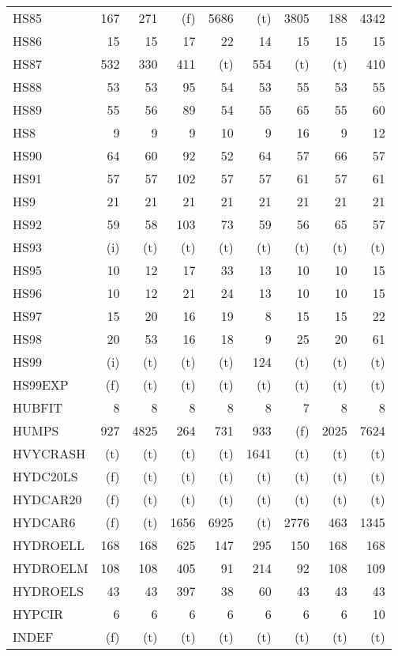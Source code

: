 \documentclass[11pt,twoside]{article}
\begin{document}
{\begin{longtable}[c]{|l|r|r|r|r|r|r|r|r|}
 HS85 & 167 & 271 & (f) & 5686 & (t) & 3805 & 188 & 4342 \\
 HS86 & 15 & 15 & 17 & 22 & 14 & 15 & 15 & 15 \\
 HS87 & 532 & 330 & 411 & (t) & 554 & (t) & (t) & 410 \\
 HS88 & 53 & 53 & 95 & 54 & 53 & 55 & 53 & 55 \\
 HS89 & 55 & 56 & 89 & 54 & 55 & 65 & 55 & 60 \\
 HS8 & 9 & 9 & 9 & 10 & 9 & 16 & 9 & 12 \\
 HS90 & 64 & 60 & 92 & 52 & 64 & 57 & 66 & 57 \\
 HS91 & 57 & 57 & 102 & 57 & 57 & 61 & 57 & 61 \\
 HS9 & 21 & 21 & 21 & 21 & 21 & 21 & 21 & 21 \\
 HS92 & 59 & 58 & 103 & 73 & 59 & 56 & 65 & 57 \\
 HS93 & (i) & (t) & (t) & (t) & (t) & (t) & (t) & (t) \\
 HS95 & 10 & 12 & 17 & 33 & 13 & 10 & 10 & 15 \\
 HS96 & 10 & 12 & 21 & 24 & 13 & 10 & 10 & 15 \\
 HS97 & 15 & 20 & 16 & 19 & 8 & 15 & 15 & 22 \\
 HS98 & 20 & 53 & 16 & 18 & 9 & 25 & 20 & 61 \\
 HS99 & (i) & (t) & (t) & (t) & 124 & (t) & (t) & (t) \\
 HS99EXP & (f) & (t) & (t) & (t) & (t) & (t) & (t) & (t) \\
 HUBFIT & 8 & 8 & 8 & 8 & 8 & 7 & 8 & 8 \\
 HUMPS & 927 & 4825 & 264 & 731 & 933 & (f) & 2025 & 7624 \\
 HVYCRASH & (t) & (t) & (t) & (t) & 1641 & (t) & (t) & (t) \\
 HYDC20LS & (f) & (t) & (t) & (t) & (t) & (t) & (t) & (t) \\
 HYDCAR20 & (f) & (t) & (t) & (t) & (t) & (t) & (t) & (t) \\
 HYDCAR6 & (f) & (t) & 1656 & 6925 & (t) & 2776 & 463 & 1345 \\
 HYDROELL & 168 & 168 & 625 & 147 & 295 & 150 & 168 & 168 \\
 HYDROELM & 108 & 108 & 405 & 91 & 214 & 92 & 108 & 109 \\
 HYDROELS & 43 & 43 & 397 & 38 & 60 & 43 & 43 & 43 \\
 HYPCIR & 6 & 6 & 6 & 6 & 6 & 6 & 6 & 10 \\
 INDEF & (f) & (t) & (t) & (t) & (t) & (t) & (t) & (t) \\

\end{longtable}}
\end{document}
